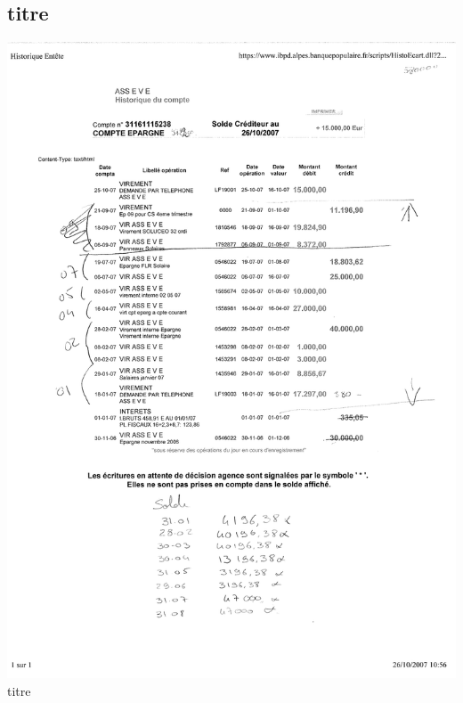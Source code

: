 \subsection{titre}
\begin{center}
\includegraphics[scale=0.6]{annexes/images/historique_compte.pdf} \\
titre
\end{center}
